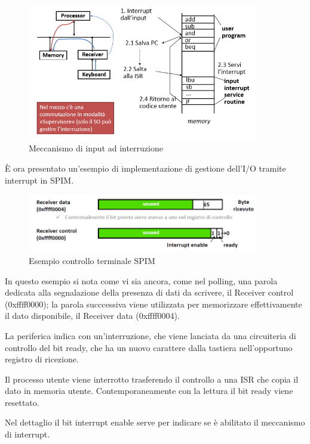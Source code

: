 \documentclass[class=book, crop=false, oneside]{standalone}
\begin{document}
\begin{figure}[!h]
	\centering
	\includegraphics[width=0.9\textwidth,keepaspectratio]{input-a-interruzione}
	\caption{Meccanismo di input ad interruzione}
\end{figure}

È ora presentato un'esempio di implementazione di gestione dell'I/O tramite interrupt in SPIM.
\begin{figure}[!h]
	\centering
	\includegraphics[width=0.9\textwidth,keepaspectratio]{SPIM2}
	\caption{Esempio controllo terminale SPIM}
\end{figure}

In questo esempio si nota come vi sia ancora, come nel polling, una parola dedicata alla segnalazione della presenza di dati da scrivere, il Receiver control (0xffff0000); la parola succcessiva viene utilizzata per memorizzare effettivamente il dato disponibile, il Receiver data (0xffff0004).

La periferica indica con un’interruzione, che viene lanciata da una circuiteria di controllo del bit ready, che ha un nuovo carattere dalla tastiera nell’opportuno registro di ricezione.

Il processo utente viene interrotto trasferendo il controllo a una ISR che copia il dato in memoria utente. Contemporaneamente con la lettura il bit ready viene resettato.

Nel dettaglio il bit interrupt enable serve per indicare se è abilitato il meccanismo di interrupt.
\end{document}
